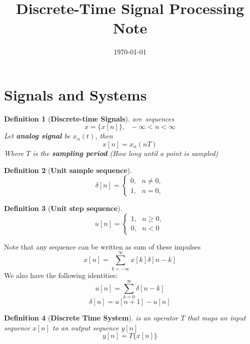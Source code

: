 \documentclass[twocolumn]{article}
\title{Discrete-Time Signal Processing Note}
\date{\today}
\newtheorem{definition}{Definition}
\newcommand{\s}{\hspace{8pt}}
\begin{document}
  \maketitle
  \section{Signals and Systems}
  \begin{definition}[\textbf{Discrete-time Signals}]
     \mbox{are sequences} $$x=\{x[n]\}, \s -\infty < n < \infty $$
     Let \textbf{analog signal} be $x_\alpha (t)$, then $$x[n] = x_\alpha(nT)$$ 
     Where $T$ is the \textbf{sampling period} (How long until a point is sampled)
  \end{definition}
  
  \begin{definition}[\textbf{Unit sample sequence}]
    \[
        \delta[n] = 
        \begin{cases}
            0, \s n \neq 0, \\
            1, \s n = 0, 
        \end{cases}
    \]
  \end{definition}
  
  \begin{definition}[\textbf{Unit step sequence}]
    \[
        u[n] = 
        \begin{cases}
            1, \s n \geq 0, \\
            0, \s n < 0
        \end{cases}
    \]
  \end{definition}
  
  Note that any sequence can be written as sum of these impulses $$x[n] = \sum_{k=-\infty}^{\infty} x[k] \delta[n - k]$$
  We also have the following identities:
  $$u[n] = \sum_{k=0}^{\infty} \delta[n - k]$$
  $$\delta[n] = u[n+1] - u[n]$$
  
  \begin{definition}[\textbf{Discrete Time System}] is an operator $T$ that maps an input sequence $x[n]$ to an output sequence $y[n]$
    $$y[n] = T\{x[n]\}$$
  
  \end{definition}
\end{document}
